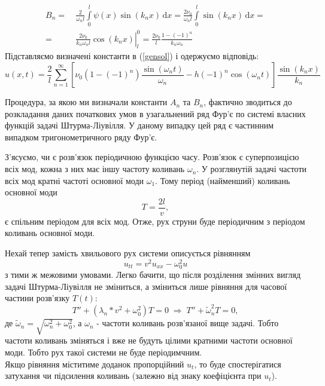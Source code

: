 \begin{equation*}
    \begin{aligned}
        B_n =&\ \frac{2}{\omega_n l} \int\limits_0^l \psi(x) \sin(k_n x) \,\mathrm{d}x = \frac{2\nu_0}{\omega_n l} \int\limits_0^l \sin(k_n x) \,\mathrm{d}x =\\
        =&\ \left.\frac{2\nu_0}{k_n\omega_n l} \cos(k_n x)\right|_l^0 = \frac{2\nu_0}{l} \frac{1 - (-1)^n}{k_n\omega_n}
    \end{aligned}
\end{equation*}
Підставляємо визначені константи в (\ref{gensol}) і одержуємо відповідь:
\begin{equation} \label{sol3}
    u(x,t) = \frac{2}{l}\sum^{\infty}_{n=1} \left[\nu_0 (1 - (-1)^n)\frac{\sin(\omega_n t)}{\omega_n} - h(-1)^n\cos(\omega_n t)\right] \frac{\sin(k_n x)}{k_n}
\end{equation}

Процедура, за якою ми визначали константи $A_n$ та $B_n$, фактично зводиться до розкладання даних початкових умов в узагальнений ряд Фур'є по системі власних функцій задачі Штурма-Ліувілля. У даному випадку цей ряд є частинним випадком тригонометричного ряду Фур'є. 

З'ясуємо, чи є розв'язок періодичною функцією часу. Розв'язок є суперпозицією всіх мод, кожна з них має іншу частоту коливань $\omega_n$. У розглянутій задачі  частоти всіх мод кратні частоті основної моди $\omega_1$. Тому період (найменший) коливань основної моди \[T = \frac{2l}{v},\] є спільним періодом для всіх мод. Отже, рух струни буде періодичним з періодом коливань основної моди. 

Нехай тепер замість хвильового рух системи описується рівнянням \[u_{tt} = v^2 u_{xx} - \omega_0^2 u\] з тими ж межовими умовами. Легко бачити, що після розділення змінних вигляд задачі Штурма-Ліувілля не зміниться, а зміниться лише рівняння для часової частини розв'язку $T(t)$:
\begin{equation*}
    T'' + (\lambda_n*v^2 + \omega_0^2) T = 0
    \;\Rightarrow\; 
    T'' + \widetilde{\omega}_n^2 T = 0,
\end{equation*}
де $\widetilde{\omega}_n = \sqrt{\omega_n^2 + \omega_0^2}$, а $\omega_n$ - частоти коливань розв'язаної вище задачі. Тобто частоти коливань зміняться і вже не будуть цілими кратними частоти основної моди. Тобто рух такої системи не буде періодимчним.\\
Якщо рівняння міститиме доданок пропорційний $u_t$, то буде спостерігатися затухання чи підсилення коливань (залежно від знаку коефіцієнта при $u_t$).

%
